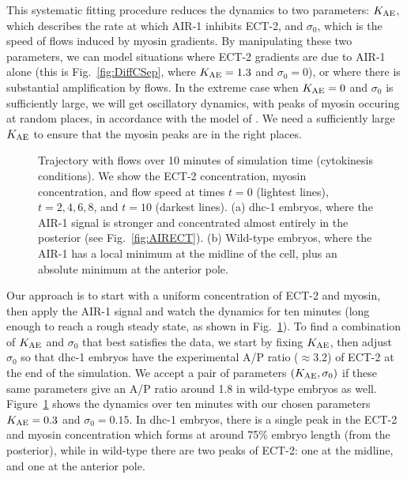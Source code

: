 \documentclass[11pt]{article}
\begin{document}
This systematic fitting procedure reduces the dynamics to two parameters: $K_\text{AE}$, which describes the rate at which AIR-1 inhibits ECT-2, and $\sigma_0$, which is the speed of flows induced by myosin gradients. By manipulating these two parameters, we can model situations where ECT-2 gradients are due to AIR-1 alone (this is Fig.\ \ref{fig:DiffCSep}, where $K_\text{AE}=1.3$ and $\sigma_0=0$), or where there is substantial amplification by flows. In the extreme case when $K_\text{AE}=0$ and $\sigma_0$ is sufficiently large, we will get oscillatory dynamics, with peaks of myosin occuring at random places, in accordance with the model of \cite{michaux2018excitable}. We need a sufficiently large $K_\text{AE}$ to ensure that the myosin peaks are in the right places.

\begin{figure}
\centering
{}
\caption{\label{fig:TryFlows} Trajectory with flows over 10 minutes of simulation time (cytokinesis conditions). We show the ECT-2 concentration, myosin concentration, and flow speed at times $t=0$ (lightest lines), $t=2,4,6,8$, and $t=10$ (darkest lines). (a) dhc-1 embryos, where the AIR-1 signal is stronger and concentrated almost entirely in the posterior (see Fig.\ \ref{fig:AIRECT}). (b) Wild-type embryos, where the AIR-1 has a local minimum at the midline of the cell, plus an absolute minimum at the anterior pole.}
\end{figure}

Our approach is to start with a uniform concentration of ECT-2 and myosin, then apply the AIR-1 signal and watch the dynamics for ten minutes (long enough to reach a rough steady state, as shown in Fig.\ \ref{fig:TryFlows}). To find a combination of $K_\text{AE}$ and $\sigma_0$ that best satisfies the data, we start by fixing $K_\text{AE}$, then adjust $\sigma_0$ so that dhc-1 embryos have the experimental A/P ratio ($\approx 3.2$) of ECT-2 at the end of the simulation. We accept a pair of parameters $\left(K_\text{AE},\sigma_0\right)$ if these same parameters give an A/P ratio around 1.8 in wild-type embryos as well. Figure\ \ref{fig:TryFlows} shows the dynamics over ten minutes with our chosen parameters $K_\text{AE}=0.3$ and $\sigma_0=0.15$. In dhc-1 embryos, there is a single peak in the ECT-2 and myosin concentration which forms at around 75\% embryo length (from the posterior), while in wild-type there are two peaks of ECT-2: one at the midline, and one at the anterior pole. 
\end{document}
